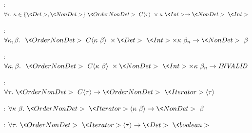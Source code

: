 \begin{figure}


    : 
    $
    \forallt{\tau} \kappa \in \{\<Det>, \<NonDet>\}\ \<OrderNonDet> \ C \angles{\tau} \ \times \kappa \ \<Int> \rightarrow 
    \<NonDet> \ \<Int>
    $
    
    \bigskip
    
    : 
    $
    \forallt{\kappa, \beta} \ \<OrderNonDet> \ C \angles{\kappa \ \beta} \ \times \<Det> \ \<Int> \times \kappa \ \beta_n \rightarrow 
    \<NonDet> \ \beta
    $
    
    \bigskip
    
    : 
    $
    \forallt{\kappa, \beta} \ \<OrderNonDet> \ C \angles{\kappa \ \beta} \ \times \<NonDet> \ \<Int> \times \kappa \ \beta_n \rightarrow 
    \|INVALID|
    $
    
    \bigskip

    : 
    $
    \forallt{\tau} \<OrderNonDet> \ C \angles{\tau} \rightarrow 
    \<OrderNonDet> \ \<Iterator> \angles{\tau}
    $
    
    \bigskip
    

    :
    $
    \forallt{\kappa\ \beta} \<OrderNonDet>\ \<Iterator>\angles{\kappa \ \beta} \rightarrow
    \<NonDet>\ \beta
    $
    
    \bigskip
    

    :
    $
    \forallt{\tau} \<OrderNonDet>\ \<Iterator>\angles{\tau} \rightarrow
    \<Det> \ \<boolean>
    $
    \bigskip


\end{figure}
